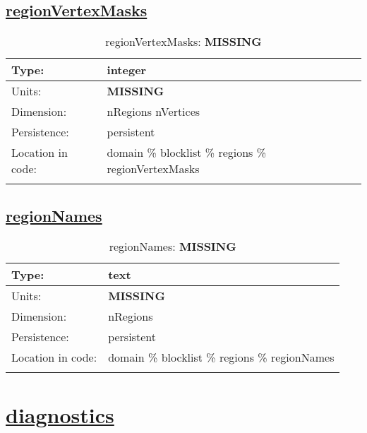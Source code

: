 \subsection[regionVertexMasks]{\hyperref[sec:var_tab_regions]{regionVertexMasks}}
\label{subsec:var_sec_regions_regionVertexMasks}
\begin{center}
\begin{longtable}{| p{2.0in} | p{4.0in} |}
        \hline 
        Type: & integer \\
        \hline 
        Units: & {\bf \color{red} MISSING} \\
        \hline 
        Dimension: & nRegions nVertices \\
        \hline 
        Persistence: & persistent \\
        \hline 
         Location in code: & domain \% blocklist \% regions \% regionVertexMasks \\
         \hline 
    \caption{regionVertexMasks: {\bf \color{red} MISSING}}
\end{longtable}
\end{center}
\subsection[regionNames]{\hyperref[sec:var_tab_regions]{regionNames}}
\label{subsec:var_sec_regions_regionNames}
\begin{center}
\begin{longtable}{| p{2.0in} | p{4.0in} |}
        \hline 
        Type: & text \\
        \hline 
        Units: & {\bf \color{red} MISSING} \\
        \hline 
        Dimension: & nRegions \\
        \hline 
        Persistence: & persistent \\
        \hline 
         Location in code: & domain \% blocklist \% regions \% regionNames \\
         \hline 
    \caption{regionNames: {\bf \color{red} MISSING}}
\end{longtable}
\end{center}
\section[diagnostics]{\hyperref[sec:var_tab_diagnostics]{diagnostics}}
\label{sec:var_sec_diagnostics}

